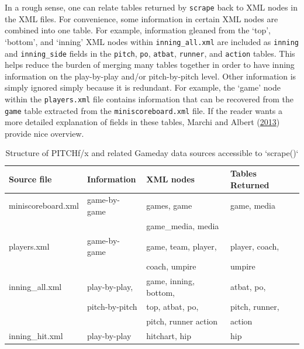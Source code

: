 \documentclass[12pt,]{isuthesis}
\begin{document}
In a rough sense, one can relate tables returned by \texttt{scrape} back
to XML nodes in the XML files. For convenience, some information in
certain XML nodes are combined into one table. For example, information
gleaned from the `top', `bottom', and `inning' XML nodes within
\texttt{inning\_all.xml} are included as \texttt{inning} and
\texttt{inning\_side} fields in the \texttt{pitch}, \texttt{po},
\texttt{atbat}, \texttt{runner}, and \texttt{action} tables. This helps
reduce the burden of merging many tables together in order to have
inning information on the play-by-play and/or pitch-by-pitch level.
Other information is simply ignored simply because it is redundant. For
example, the `game' node within the \texttt{players.xml} file contains
information that can be recovered from the \texttt{game} table extracted
from the \texttt{miniscoreboard.xml} file. If the reader wants a more
detailed explanation of fields in these tables, Marchi and Albert
(\protect\hyperlink{ref-baseball}{2013}) provide nice overview.

\begin{table}

\caption{\label{tab:pitchfx}Structure of PITCHf/x and related Gameday data sources accessible to `scrape()`}
\centering
\begin{tabular}[t]{llll}
\toprule
Source file & Information & XML nodes & Tables Returned\\
\midrule
miniscoreboard.xml & game-by-game & games, game & game, media\\
 &  & game\_media, media & \\
players.xml & game-by-game & game, team, player, & player, coach,\\
 &  & coach, umpire & umpire\\
inning\_all.xml & play-by-play, & game, inning, bottom, & atbat, po,\\
\addlinespace
 & pitch-by-pitch & top, atbat, po, & pitch, runner,\\
 &  & pitch, runner action & action\\
inning\_hit.xml & play-by-play & hitchart, hip & hip\\
\bottomrule
\end{tabular}
\end{table}
\end{document}
